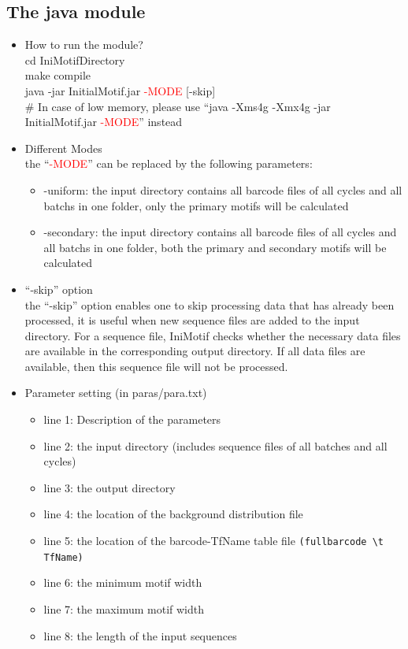 \documentclass[a4paper,10pt]{article}
\begin{document}
\subsection{The java module}

\begin{itemize}
\item How to run the module? \\
cd IniMotifDirectory \\
make compile \\
java -jar InitialMotif.jar \textcolor{red}{-MODE} [-skip] \\
\# In case of low memory, please use ``java -Xms4g -Xmx4g -jar InitialMotif.jar \textcolor{red}{-MODE}'' instead 

\item Different Modes \\
the ``\textcolor{red}{-MODE}'' can be replaced by the following parameters:
\begin{itemize}
 \item -uniform: the input directory contains all barcode files of all cycles and all batchs in one folder, only the primary motifs will be calculated
 \item -secondary: the input directory contains all barcode files of all cycles and all batchs in one folder, both the primary and secondary motifs will be calculated
\end{itemize}

\item ``-skip'' option \\
the ``-skip'' option enables one to skip processing data that has already been processed, it is useful when new sequence files are added to the input directory.
For a sequence file, IniMotif checks whether the necessary data files are available in the corresponding output directory. If all data files are available, then this sequence file will not be processed.

\item Parameter setting (in paras/para.txt)
\begin{itemize}
 \item line 1: Description of the parameters
 \item line 2: the input directory (includes sequence files of all batches and all cycles)
 \item line 3: the output directory
 \item line 4: the location of the background distribution file
 \item line 5: the location of the barcode-TfName table file \verb+(fullbarcode \t TfName)+
 \item line 6: the minimum motif width
 \item line 7: the maximum motif width
 \item line 8: the length of the input sequences
\end{itemize}


\end{itemize}
\end{document}
